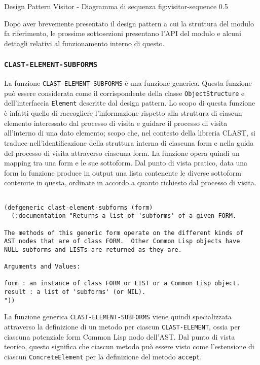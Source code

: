       {Design Pattern Visitor - Diagramma di sequenza}
      {fig:visitor-sequence}
      {0.5}

Dopo aver brevemente presentato il design pattern a cui la struttura del modulo
fa riferimento, le prossime sottosezioni presentano l'API del modulo e alcuni
dettagli relativi al funzionamento interno di questo.

\subsubsection{\texttt{CLAST-ELEMENT-SUBFORMS}}

La funzione \texttt{CLAST-ELEMENT-SUBFORMS} è una funzione generica. Questa
funzione può essere considerata come il corrispondente della classe
\texttt{ObjectStructure} e dell'interfaccia \texttt{Element} descritte dal
design pattern. Lo scopo di questa funzione è infatti quello di raccogliere
l'informazione rispetto alla struttura di ciascun elemento interessato dal
processo di visita e guidare il processo di visita all'interno di una dato
elemento; scopo che, nel contesto della libreria CLAST, si traduce
nell'identificazione della struttura interna di ciascuna form e nella guida del
processo di visita attraverso ciascuna form. La funzione opera quindi un mapping
tra una form e le sue sottoform. Dal punto di vista pratico, data una form la
funzione produce in output una lista contenente le diverse sottoform contenute
in questa, ordinate in accordo a quanto richiesto dal processo di visita.

\begin{lstlisting}[caption=Definizione della funzione \texttt
{CLAST-ELEMENT-SUBFORMS}]

(defgeneric clast-element-subforms (form)
  (:documentation "Returns a list of 'subforms' of a given FORM.

The methods of this generic form operate on the different kinds of
AST nodes that are of class FORM.  Other Common Lisp objects have
NULL subforms and LISTs are returned as they are.

Arguments and Values:

form : an instance of class FORM or LIST or a Common Lisp object.
result : a list of 'subforms' (or NIL).
"))

\end{lstlisting}

La funzione generica \texttt{CLAST-ELEMENT-SUBFORMS} viene quindi specializzata
attraverso la definizione di un metodo per ciascun \texttt{CLAST-ELEMENT}, ossia
per ciascuna potenziale form Common Lisp nodo dell'AST. Dal punto di vista
teorico, questo significa che ciascun metodo può essere visto come l'estensione
di ciascun \texttt{ConcreteElement} per la definizione del metodo
\texttt{accept}.

